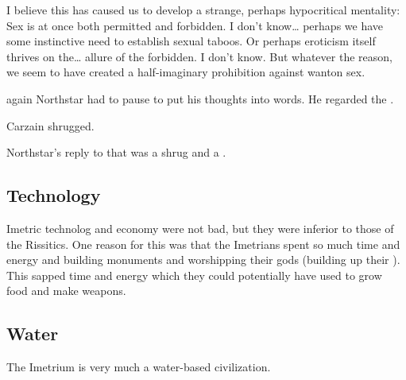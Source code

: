 \begin{prose}
{  I believe this has caused us to develop a strange, perhaps hypocritical mentality: Sex is at once both permitted and forbidden. I don't know\ldots{} perhaps we have some instinctive need to establish sexual taboos. Or perhaps eroticism itself thrives on the\ldots{} allure of the forbidden. I don't know. But whatever the reason, we seem to have created a half-imaginary prohibition against wanton sex.}
  
  
   again Northstar had to pause to put his thoughts into words.  He regarded the \human. 
  
  Carzain shrugged. 
  
  Northstar's reply to that was a shrug and a . 
\end{prose}





\subsection{Technology}
Imetric technolog and economy were not bad, but they were inferior to those of the Rissitics. 
One reason for this was that the Imetrians spent so much time and energy  and building monuments and worshipping their gods (building up their ).
This sapped time and energy which they could potentially have used to grow food and make weapons.





\subsection{Water}
The Imetrium is very much a water-based civilization. 

